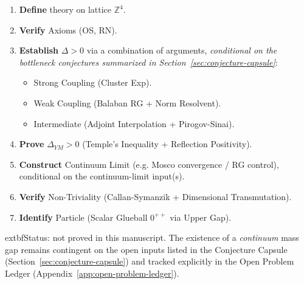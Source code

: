 \begin{enumerate}
    \item \textbf{Define} theory on lattice $\mathbb{Z}^4$.
    \item \textbf{Verify} Axioms (OS, RN).
    \item \textbf{Establish} $\Delta > 0$ via a combination of arguments, \emph{conditional on the bottleneck conjectures summarized in Section~\ref{sec:conjecture-capsule}}:
    \begin{itemize}
        \item Strong Coupling (Cluster Exp).
        \item Weak Coupling (Balaban RG + Norm Resolvent).
        \item Intermediate (Adjoint Interpolation + Pirogov-Sinai).
    \end{itemize}
    \item \textbf{Prove} $\Delta_{YM} > 0$ (Temple's Inequality + Reflection Positivity).
    \item \textbf{Construct} Continuum Limit (e.g. Mosco convergence / RG control), conditional on the continuum-limit input(s).
    \item \textbf{Verify} Non-Triviality (Callan-Symanzik + Dimensional Transmutation).
    \item \textbf{Identify} Particle (Scalar Glueball $0^{++}$ via Upper Gap).
\end{enumerate}

	extbf{Status: not proved in this manuscript.}
The existence of a \emph{continuum} mass gap remains contingent on the open inputs listed in the Conjecture Capsule (Section~\ref{sec:conjecture-capsule}) and tracked explicitly in the Open Problem Ledger (Appendix~\ref{app:open-problem-ledger}).


